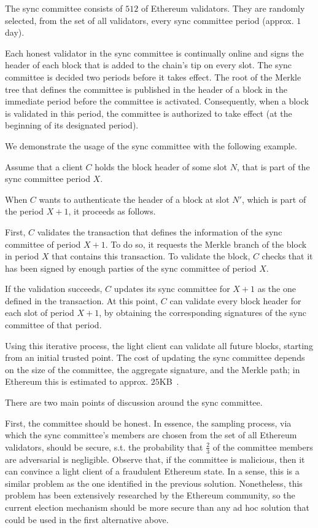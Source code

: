 The sync committee consists of $512$ of Ethereum validators. They are randomly
selected, from the set of all validators, every sync committee period (approx.
$1$ day).

Each honest validator in the sync committee is continually online and signs the
header of each block that is added to the chain's tip on every slot. The sync
committee is decided two periods before it takes effect. The root of the Merkle
tree that defines the committee is published in the header of a block in the
immediate period before the committee is activated. Consequently, when a block
is validated in this period, the committee is authorized to take effect (at the
beginning of its designated period).

We demonstrate the usage of the sync committee with the following example.

Assume that a client $C$ holds the block header of some slot $N$, that is part
of the sync committee period $X$.

When $C$ wants to authenticate the header of a block at slot $N'$, which is
part of the period $X+1$, it proceeds as follows.

First, $C$ validates the transaction that defines the information of the sync
committee of period $X+1$. To do so, it requests the Merkle branch of the block
in period $X$ that contains this transaction. To validate the block, $C$ checks
that it has been signed by enough parties of the sync committee of period $X$.

If the validation succeeds, $C$ updates its sync committee for $X+1$ as the one
defined in the transaction. At this point, $C$ can validate every block header
for each slot of period $X+1$, by obtaining the corresponding signatures of the
sync committee of that period.

Using this iterative process, the light client can validate all future blocks,
starting from an initial trusted point. The cost of updating the sync committee
depends on the size of the committee, the aggregate signature, and the Merkle
path; in Ethereum this is estimated to approx. $25$KB~\cite{sync-committee}.

There are two main points of discussion around the sync committee.

First, the committee should be honest. In essence, the sampling process, via
which the sync committee's members are chosen from the set of all Ethereum
validators, should be secure, s.t. the probability that $\frac{2}{3}$ of the
committee members are adversarial is negligible. Observe that, if the committee
is malicious, then it can convince a light client of a fraudulent Ethereum
state. In a sense, this is a similar problem as the one identified in the
previous solution. Nonetheless, this problem has been extensively researched by
the Ethereum community, so the current election mechanism should be more secure
than any ad hoc solution that could be used in the first alternative above.

